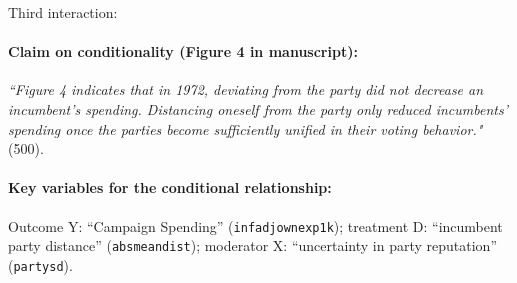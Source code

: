 \documentclass[12pt]{article}
\begin{document}
\clearpage

\noindent Third interaction:

\paragraph{Claim on conditionality (Figure 4 in manuscript):} \emph{``Figure 4 indicates that in 1972, deviating from the party did not decrease an incumbent's spending. Distancing oneself from the party only reduced incumbents' spending once the parties become sufficiently unified in their voting behavior."} (500). 

\paragraph{Key variables for the conditional relationship:} Outcome Y:
``Campaign Spending'' (\texttt{infadjownexp1k}); treatment D: ``incumbent party distance'' (\texttt{absmeandist}); moderator X: ``uncertainty in party reputation''
(\texttt{partysd}).

\newpage
\end{document}
